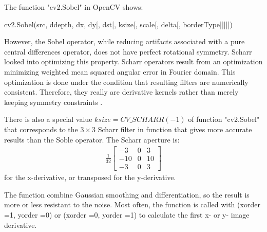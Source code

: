 The function "cv2.Sobel" in OpenCV \cite{opencvdevteamOpenCV13Documentation}shows:
\begin{python}[caption={Model of Sobel Filter},label={lst:Model of Sobel filter}]
	cv2.Sobel(src, ddepth, dx, dy[, dst[, ksize[, scale[, delta[, borderType]]]]]) 
\end{python}

However, the Sobel operator, while reducing artifacts associated with a pure central differences operator, does not have perfect rotational symmetry.  Scharr looked into optimizing this property. Scharr operators result from an optimization minimizing weighted mean squared angular error in Fourier domain. This optimization is done under the condition that resulting filters are numerically consistent. Therefore, they really are derivative kernels rather than merely keeping symmetry constraints \cite{SobelOperator2020}.

There is also a special value $ksize=CV\_SCHARR(-1)$ of function "cv2.Sobel" that corresponds to the $3\times3$ Scharr filter in function that gives more accurate results than the Soble operator. The Scharr aperture is:
\begin{align}
	\frac{1}{32}\begin{bmatrix}
		-3& 0& 3\\
		-10&0&10\\
		-3&0&3
	\end{bmatrix} \nonumber
\end{align}
for the x-derivative, or transposed for the y-derivative.

The function combine Gaussian smoothing and differentiation, so the result is more or less resistant to the noise. Most often, the function is called with (xorder =1, yorder =0) or (xorder =0, yorder =1) to calculate the first x- or y- image derivative.


